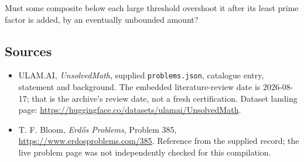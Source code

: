 \documentclass[11pt,a4paper]{article}
\begin{document}
Must some composite below each large threshold overshoot it after its least prime factor is added, by an eventually unbounded amount?

\subsection{Sources}

{\small

\begin{itemize}

\item[\hypertarget{source:statement:1}{S1}] ULAM.AI, \emph{UnsolvedMath}, supplied \texttt{problems.json}, catalogue entry, statement and background. The embedded literature-review date is 2026-08-17; that is the archive’s review date, not a fresh certification. Dataset landing page: \url{https://huggingface.co/datasets/ulamai/UnsolvedMath}.

\item[\hypertarget{source:statement:2}{S2}] T. F. Bloom, \emph{Erdős Problems}, Problem 385, \url{https://www.erdosproblems.com/385}. Reference from the supplied record; the live problem page was not independently checked for this compilation.

\end{itemize}

}

\label{end:statement}
\end{document}
